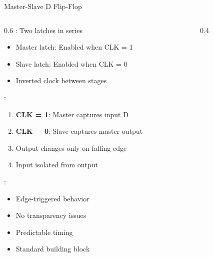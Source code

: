 \begin{frame}{Master-Slave D Flip-Flop}
\begin{columns}
\begin{column}{0.6\textwidth}
: Two latches in series
\begin{itemize}
\item Master latch: Enabled when CLK = 1
\item Slave latch: Enabled when CLK = 0
\item Inverted clock between stages
\end{itemize}
\vspace{0.3cm}
:
\begin{enumerate}
\item \textbf{CLK = 1}: Master captures input D
\item \textbf{CLK = 0}: Slave captures master output
\item Output changes only on falling edge
\item Input isolated from output
\end{enumerate}
\vspace{0.3cm}
:
\begin{itemize}
\item Edge-triggered behavior
\item No transparency issues
\item Predictable timing
\item Standard building block
\end{itemize}
\end{column}
\begin{column}{0.4\textwidth}
\begin{center}

\end{center}
\vspace{0.3cm}
\begin{center}

\end{center}
\end{column}
\end{columns}
\end{frame}

